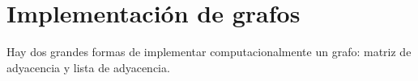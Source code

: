 \part{Implementación de grafos}

Hay dos grandes formas de implementar computacionalmente un grafo: matriz de adyacencia y lista de adyacencia.

